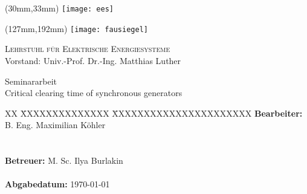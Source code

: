 \begin{titlepage}
	\thispagestyle{empty}
	\setcounter{page}{-1}
	
	\begin{textblock*}{\textwidth}(30mm,33mm)
	\texttt{[image: ees]}
	\end{textblock*}
	
	\begin{textblock*}{\textwidth}(127mm,192mm)
	\texttt{[image: fausiegel]}
	\end{textblock*}
	
	{\raggedleft
	\textsc{Lehrstuhl für Elektrische Energiesysteme}\\
	Vorstand: Univ.-Prof. Dr.-Ing. Matthias Luther
	\par}
	
	\vspace{51mm}
	
	{\centering
	
	\large{Seminararbeit} \\	
	\Large{Critical clearing time of synchronous generators}
	
	\par}
	
	\vspace{105mm}
	
	{\raggedright
	\begin{tabbing}
	XX \= XXXXXXXXXXXXXX \= XXXXXXXXXXXXXXXXXXXXXX \kill
			\> \textbf{Bearbeiter:} 	\> B. Eng. Maximilian Köhler \\
			\>						\> 23176975		\\
	 		\>												\>									\\
			\> \textbf{Betreuer:}		\> M. Sc. Ilya Burlakin \\
			\>												\>									\\
			\> \textbf{Abgabedatum:}	\> \today															
	\end{tabbing}
	\par}
\end{titlepage}
